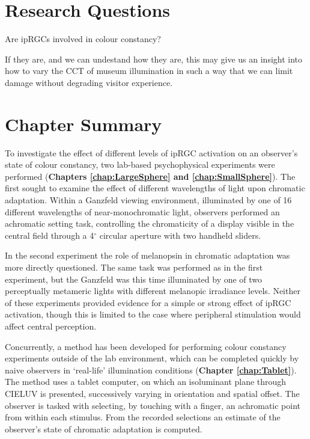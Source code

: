 \section{Research Questions}

Are ipRGCs involved in colour constancy?

If they are, and we can undestand how they are, this may give us an insight into how to vary the \gls{CCT} of museum illumination in such a way that we can limit damage without degrading visitor experience.

\section{Chapter Summary}

To investigate the effect of different levels of \gls{ipRGC} activation on an observer's state of colour constancy, two lab-based psychophysical experiments were performed (\textbf{Chapters \ref{chap:LargeSphere} and \ref{chap:SmallSphere}}). The first sought to examine the effect of different wavelengths of light upon chromatic adaptation. Within a Ganzfeld viewing environment, illuminated by one of 16 different wavelengths of near-monochromatic light, observers performed an achromatic setting task, controlling the chromaticity of a display visible in the central field through a 4$^{\circ}$ circular aperture with two handheld sliders.

In the second experiment the role of melanopsin in chromatic adaptation was more directly questioned. The same task was performed as in the first experiment, but the Ganzfeld was this time illuminated by one of two perceptually metameric lights with different melanopic irradiance levels. Neither of these experiments provided evidence for a simple or strong effect of ipRGC activation, though this is limited to the case where peripheral stimulation would affect central perception.

Concurrently, a method has been developed for performing colour constancy experiments outside of the lab environment, which can be completed quickly by naive observers in `real-life' illumination conditions (\textbf{Chapter \ref{chap:Tablet}}). The method uses a tablet computer, on which an isoluminant plane through CIELUV is presented, successively varying in orientation and spatial offset. The observer is tasked with selecting, by touching with a finger, an achromatic point from within each stimulus. From the recorded selections an estimate of the observer's state of chromatic adaptation is computed.

